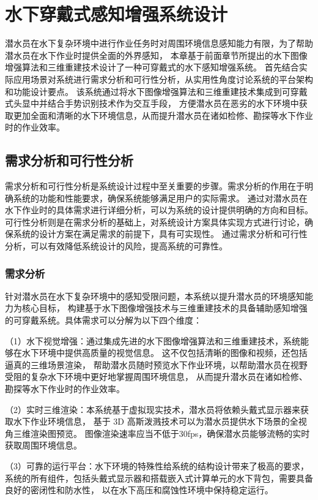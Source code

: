 
\chapter{水下穿戴式感知增强系统设计}
潜水员在水下复杂环境中进行作业任务时对周围环境信息感知能力有限，为了帮助潜水员在水下作业时提供全面的外界感知，
本章基于前面章节所提出的水下图像增强算法和三维重建技术设计了一种可穿戴式的水下感知增强系统。
首先结合实际应用场景对系统进行需求分析和可行性分析，从实用性角度讨论系统的平台架构和功能设计要点。
该系统通过将水下图像增强算法和三维重建技术集成到可穿戴式头显中并结合手势识别技术作为交互手段，
方便潜水员在恶劣的水下环境中获取更加全面和清晰的水下环境信息，从而提升潜水员在诸如检修、勘探等水下作业时的作业效率。

\section{需求分析和可行性分析}

需求分析和可行性分析是系统设计过程中至关重要的步骤。需求分析的作用在于明确系统的功能和性能要求，确保系统能够满足用户的实际需求。
通过对潜水员在水下作业时的具体需求进行详细分析，可以为系统的设计提供明确的方向和目标。
可行性分析则是在需求分析的基础上，对系统设计方案具体实现方式进行讨论，确保系统的设计方案在满足需求的前提下，具有可实现性。
通过需求分析和可行性分析，可以有效降低系统设计的风险，提高系统的可靠性。

\subsection{需求分析}
针对潜水员在水下复杂环境中的感知受限问题，本系统以提升潜水员的环境感知能力为核心目标，
构建基于水下图像增强技术与三维重建技术的具备辅助感知增强的可穿戴系统。具体需求可以分解为以下四个维度：

（1）水下视觉增强：通过集成先进的水下图像增强算法和三维重建技术，系统能够在水下环境中提供高质量的视觉信息。
这不仅包括清晰的图像和视频，还包括逼真的三维场景渲染，
帮助潜水员随时预览水下作业环境，以帮助潜水员在视野受阻的复杂水下环境中更好地掌握周围环境信息，
从而提升潜水员在诸如检修、勘探等水下作业时的作业效率。

（2）实时三维渲染：本系统基于虚拟现实技术，潜水员将依赖头戴式显示器来获取水下作业环境信息，
基于 3D 高斯泼溅技术可以为潜水员提供水下场景的全视角三维渲染图预览。
图像渲染速率应当不低于30fps，确保潜水员能够流畅的实时获取周围环境信息。

（3）可靠的运行平台：水下环境的特殊性给系统的结构设计带来了极高的要求，
系统的所有组件，包括头戴式显示器和搭载嵌入式计算单元的水下背包，需要具备良好的密闭性和防水性，
以在水下高压和腐蚀性环境中保持稳定运行。

